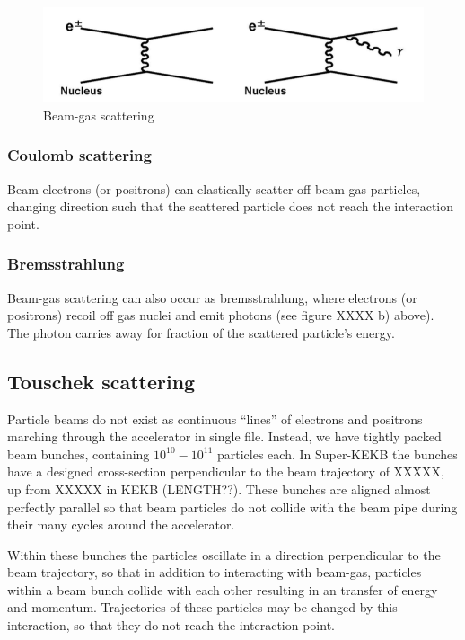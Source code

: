 \documentclass[12pt]{thesis}  %
\begin{document}
\begin{figure}[h]
\centering
\includegraphics[width=\linewidth]{images/beam-gas-scattering.png}
\caption{Beam-gas scattering}
\label{fig:test2}
\end{figure}


\subsubsection{Coulomb scattering}

Beam electrons (or positrons) can elastically scatter off beam gas particles, changing direction such that the scattered particle does not reach the interaction point.

\subsubsection{Bremsstrahlung}

Beam-gas scattering can also occur as bremsstrahlung, where electrons (or positrons) recoil off gas nuclei and emit photons (see figure XXXX b) above). The photon carries away for fraction of the scattered particle's energy.


\subsection{Touschek scattering}

Particle beams do not exist as continuous ``lines'' of electrons and positrons marching through the accelerator in single file. Instead, we have tightly packed beam bunches, containing $10^{10} - 10^{11}$ particles each. In Super-KEKB the bunches have a designed cross-section perpendicular to the beam trajectory of XXXXX, up from XXXXX in KEKB (LENGTH??). These bunches are aligned almost perfectly parallel so that beam particles do not collide with the beam pipe during their many cycles around the accelerator.

Within these bunches the particles oscillate in a direction perpendicular to the beam trajectory, so that in addition to interacting with beam-gas, particles within a beam bunch collide with each other resulting in an transfer of energy and momentum. Trajectories of these particles may be changed by this interaction, so that they do not reach the interaction point. 
\end{document}
